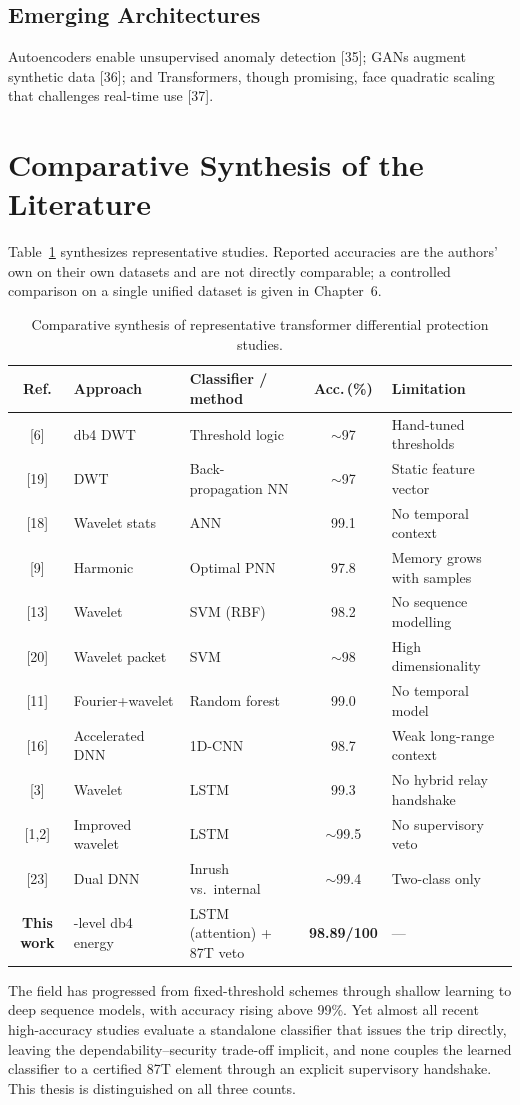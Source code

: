 \documentclass[12pt,a4paper,oneside]{report}
\begin{document}
\subsection{Emerging Architectures}
Autoencoders enable unsupervised anomaly detection [35]; GANs augment synthetic data [36]; and Transformers, though promising, face quadratic scaling that challenges real-time use [37].

\section{Comparative Synthesis of the Literature}
Table~\ref{tab:litcompare} synthesizes representative studies. Reported accuracies are the authors' own on their own datasets and are not directly comparable; a controlled comparison on a single unified dataset is given in Chapter~6.
\begin{table}[H]\centering
\caption{Comparative synthesis of representative transformer differential protection studies.}\label{tab:litcompare}
\footnotesize\setlength{\tabcolsep}{4pt}
\begin{tabular}{@{}c>{\raggedright\arraybackslash}p{2.2cm}>{\raggedright\arraybackslash}p{3.5cm}c>{\raggedright\arraybackslash}p{4.2cm}@{}}
\toprule
\textbf{Ref.} & \textbf{Approach} & \textbf{Classifier / method} & \textbf{Acc.\,(\%)} & \textbf{Limitation}\\ \midrule
{[6]} & db4 DWT & Threshold logic & $\sim$97 & Hand-tuned thresholds\\
{[19]} & DWT & Back-propagation NN & $\sim$97 & Static feature vector\\
{[18]} & Wavelet stats & ANN & 99.1 & No temporal context\\
{[9]} & Harmonic & Optimal PNN & 97.8 & Memory grows with samples\\
{[13]} & Wavelet & SVM (RBF) & 98.2 & No sequence modelling\\
{[20]} & Wavelet packet & SVM & $\sim$98 & High dimensionality\\
{[11]} & Fourier+wavelet & Random forest & 99.0 & No temporal model\\
{[16]} & Accelerated DNN & 1D-CNN & 98.7 & Weak long-range context\\
{[3]} & Wavelet & LSTM & 99.3 & No hybrid relay handshake\\
{[1,2]} & Improved wavelet & LSTM & $\sim$99.5 & No supervisory veto\\
{[23]} & Dual DNN & Inrush vs.\ internal & $\sim$99.4 & Two-class only\\
\textbf{This work} & 3-level db4 energy & LSTM (attention) + 87T veto & \textbf{98.89/100} & ---\\
\bottomrule
\end{tabular}
\end{table}
The field has progressed from fixed-threshold schemes through shallow learning to deep sequence models, with accuracy rising above 99\%. Yet almost all recent high-accuracy studies evaluate a standalone classifier that issues the trip directly, leaving the dependability--security trade-off implicit, and none couples the learned classifier to a certified 87T element through an explicit supervisory handshake. This thesis is distinguished on all three counts.
\end{document}
